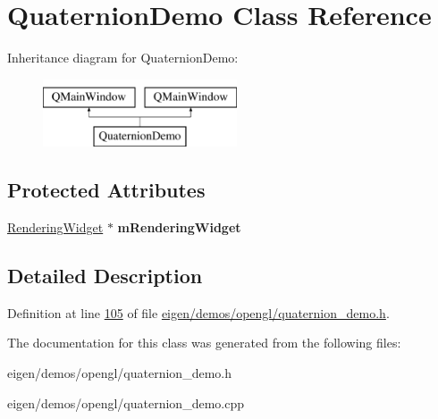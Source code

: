 \hypertarget{class_quaternion_demo}{}\section{Quaternion\+Demo Class Reference}
\label{class_quaternion_demo}
Inheritance diagram for Quaternion\+Demo\+:\begin{figure}[H]
\begin{center}
\leavevmode
\includegraphics[height=2.000000cm]{class_quaternion_demo}
\end{center}
\end{figure}
\subsection*{Protected Attributes}
\begin{DoxyCompactItemize}
\item 
\mbox{\label{class_quaternion_demo_a806ac796b54c220e31a51f7c9957fb87}} 
\hyperlink{class_rendering_widget}{Rendering\+Widget} $\ast$ {\bfseries m\+Rendering\+Widget}
\end{DoxyCompactItemize}


\subsection{Detailed Description}


Definition at line \hyperlink{eigen_2demos_2opengl_2quaternion__demo_8h_source_l00105}{105} of file \hyperlink{eigen_2demos_2opengl_2quaternion__demo_8h_source}{eigen/demos/opengl/quaternion\+\_\+demo.\+h}.



The documentation for this class was generated from the following files\+:\begin{DoxyCompactItemize}
\item 
eigen/demos/opengl/quaternion\+\_\+demo.\+h\item 
eigen/demos/opengl/quaternion\+\_\+demo.\+cpp\end{DoxyCompactItemize}
